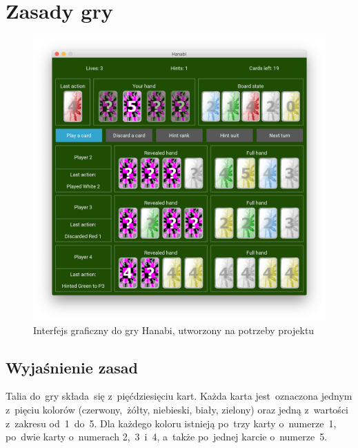 \documentclass[declaration,shortabstract,inz]{iithesis}
\begin{document}
\chapter{Zasady gry}

\renewcommand{\thefigure}{1}
\begin{figure}[ht!]
	\centering
	\includegraphics[width=1.0\linewidth]{gui.png}
	\caption[Caption]{Interfejs graficzny do gry Hanabi, utworzony na potrzeby projektu}
\end{figure}

\section{Wyjaśnienie zasad}

Talia do~gry składa~się z~pięćdziesięciu kart. Każda karta jest~oznaczona jednym z~pięciu kolorów (czerwony, żółty, niebieski, biały, zielony) oraz jedną z~wartości z~zakresu od~1~do~5. Dla każdego koloru istnieją po~trzy karty o~numerze~1, po~dwie karty o~numerach 2,~3~i~4, a~także po~jednej karcie o~numerze~5.
\end{document}
